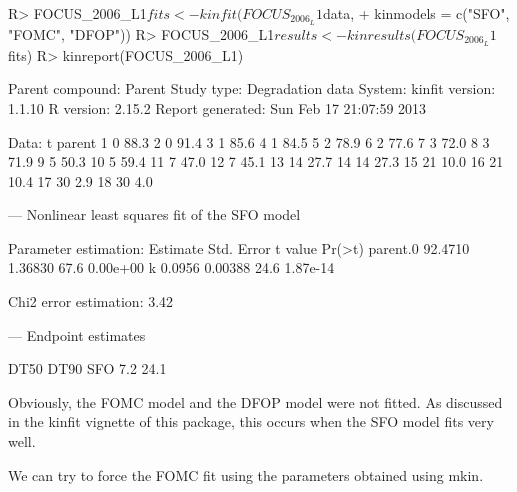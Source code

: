 \documentclass[12pt,a4paper]{article}
\begin{document}
\begin{Schunk}
\begin{Sinput}
R> FOCUS_2006_L1$fits <- kinfit(FOCUS_2006_L1$data, 
+   kinmodels = c("SFO", "FOMC", "DFOP"))
R> FOCUS_2006_L1$results <- kinresults(FOCUS_2006_L1$fits)
R> kinreport(FOCUS_2006_L1)
\end{Sinput}
\begin{Soutput}
Parent compound:  Parent 
Study type:       Degradation data 
System:            
kinfit version:   1.1.10 
R version:        2.15.2 
Report generated: Sun Feb 17 21:07:59 2013 

Data:
    t parent
1   0   88.3
2   0   91.4
3   1   85.6
4   1   84.5
5   2   78.9
6   2   77.6
7   3   72.0
8   3   71.9
9   5   50.3
10  5   59.4
11  7   47.0
12  7   45.1
13 14   27.7
14 14   27.3
15 21   10.0
16 21   10.4
17 30    2.9
18 30    4.0



---
Nonlinear least squares fit of the SFO model

Parameter estimation:	
         Estimate Std. Error t value   Pr(>t)
parent.0  92.4710    1.36830    67.6 0.00e+00
k          0.0956    0.00388    24.6 1.87e-14

Chi2 error estimation: 3.42 %



---
Endpoint estimates

    DT50 DT90
SFO  7.2 24.1
\end{Soutput}
\end{Schunk}

Obviously, the FOMC model and the DFOP model were not fitted. As discussed in the
kinfit vignette of this package, this occurs when the SFO model fits very well.

We can try to force the FOMC fit using the parameters obtained using mkin.
\end{document}
